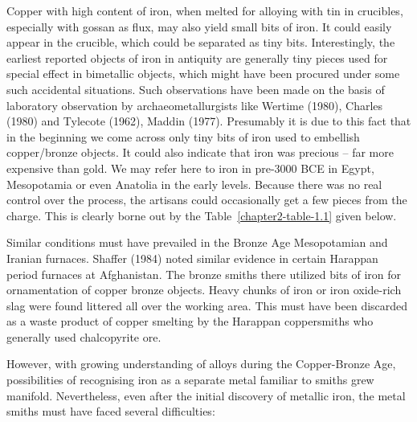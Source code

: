 Copper with high content of iron, when melted for alloying with tin in crucibles, especially with gossan as flux, may also yield small bits of iron. It could easily appear in the crucible, which could be separated as tiny bits.  Interestingly, the earliest reported objects of iron in antiquity are generally tiny pieces used for special effect in bimetallic objects, which might have been procured under some such accidental situations. Such observations have been made on the basis of laboratory observation by archaeometallurgists like Wertime (1980), Charles (1980) and Tylecote (1962), Maddin (1977). Presumably it is due to this fact that in the beginning we come across only tiny bits of iron used to embellish copper/bronze objects. It could also indicate that iron was precious – far more expensive than gold. We may refer here to iron in pre-3000 BCE in Egypt, Mesopotamia or even Anatolia in the early levels. Because there was no real control over the process, the artisans could occasionally get a few pieces from the charge.  This is clearly borne out by the Table~\ref{chapter2-table-1.1} given below. 

Similar conditions must have prevailed in the Bronze Age Mesopotamian and Iranian furnaces. Shaffer (1984) noted similar evidence in certain Harappan period furnaces at Afghanistan. The bronze smiths there utilized bits of iron for ornamentation of copper bronze objects. Heavy chunks of iron or iron oxide-rich slag were found littered all over the working area. This must have been discarded as a waste product of copper smelting by the Harappan coppersmiths who generally used chalcopyrite ore.

However, with growing understanding of alloys during the Copper-Bronze Age, possibilities of recognising iron as a separate metal familiar to smiths grew manifold. Nevertheless, even after the initial discovery of metallic iron, the metal smiths must have faced several difficulties:

\vspace{-.3cm}

